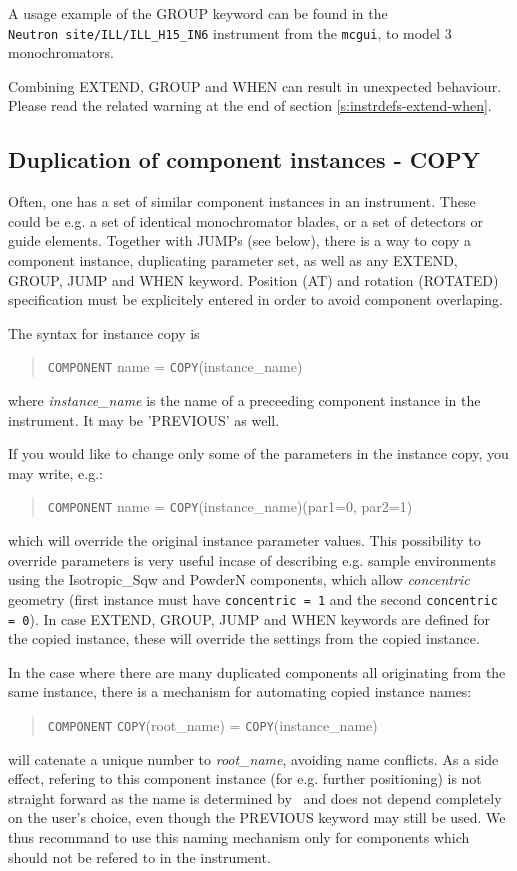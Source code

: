 A usage example of the GROUP keyword can be found in the \\
\verb+Neutron site/ILL/ILL_H15_IN6+ instrument from the \verb+mcgui+, to model 3 monochromators.

Combining EXTEND, GROUP and WHEN can result in unexpected behaviour. Please read the related warning at the end of section \ref{s:instrdefs-extend-when}.

\subsection{Duplication of component instances - COPY}
\label{s:instrdefs-extend-copy}

Often, one has a set of similar component instances in an instrument. These could be e.g. a set of identical monochromator blades, or a set of detectors or guide elements.
Together with JUMPs (see below), there is a way to copy a component instance, duplicating parameter set, as well as any EXTEND, GROUP, JUMP and WHEN keyword.
Position (AT) and rotation (ROTATED) specification must be explicitely entered in order to avoid component overlaping.

The syntax for instance copy is
\begin{quote}
  \texttt{COMPONENT} name = \texttt{COPY}(instance\_name)
\end{quote}
where {\it instance\_name} is the name of a preceeding component instance in the instrument. It may be 'PREVIOUS' as well.

If you would like to change only some of the parameters in the instance copy, you may write, e.g.:
\begin{quote}
  \texttt{COMPONENT} name = \texttt{COPY}(instance\_name)(par1=0, par2=1)
\end{quote}
which will override the original instance parameter values. This possibility to override parameters is very useful incase of describing e.g. sample environments using the Isotropic\_Sqw and PowderN components, which allow \emph{concentric} geometry (first instance must have \verb+concentric = 1+ and the second \verb+concentric = 0+). In case EXTEND, GROUP, JUMP and WHEN keywords are defined for the copied instance, these will override the settings from the copied instance.
 

In the case where there are many duplicated components all originating from the same instance, there is a mechanism for automating copied instance names:
\begin{quote}
  \texttt{COMPONENT} \texttt{COPY}(root\_name) = \texttt{COPY}(instance\_name)
\end{quote}
will catenate a unique number to {\it root\_name}, avoiding name
conflicts. As a side effect, refering to this component instance (for
e.g. further positioning) is not straight forward as the name is
determined by \MCS\ and does not depend completely on the user's
choice, even though the PREVIOUS keyword may still be used. We thus recommand to use this naming mechanism only for components which should not be refered to in the instrument.

